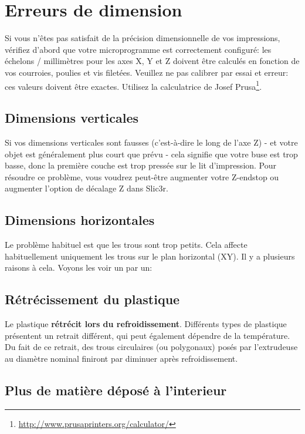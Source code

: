 \section{Erreurs de dimension}

Si vous n'êtes pas satisfait de la précision dimensionnelle de vos impressions, vérifiez d'abord que votre microprogramme est correctement configuré: les échelons / millimètres pour les axes X, Y et Z doivent être calculés en fonction de vos courroies, poulies et vis filetées. Veuillez ne pas calibrer par essai et erreur: ces valeurs doivent être exactes. Utilisez la calculatrice de Josef Prusa\footnote{\url{http://www.prusaprinters.org/calculator/}}.

\subsection{Dimensions verticales}

Si vos dimensions verticales sont fausses (c'est-à-dire le long de l'axe Z) - et votre objet est généralement plus court que prévu - cela signifie que votre buse est trop basse, donc la première couche est trop pressée sur le lit d'impression. Pour résoudre ce problème, vous voudrez peut-être augmenter votre Z-endstop ou augmenter l'option de décalage Z dans Slic3r.

\subsection{Dimensions horizontales}

Le problème habituel est que les trous sont trop petits. Cela affecte habituellement uniquement les trous sur le plan horizontal (XY). Il y a plusieurs raisons à cela. Voyons les voir un par un:

\subsection{Rétrécissement du plastique}

Le plastique \textbf{rétrécit lors du refroidissement}. Différents types de plastique présentent un retrait différent, qui peut également dépendre de la température. Du fait de ce retrait, des trous circulaires (ou polygonaux) posés par l'extrudeuse au diamètre nominal finiront par diminuer après refroidissement.

\subsection{Plus de matière déposé à l'interieur}

